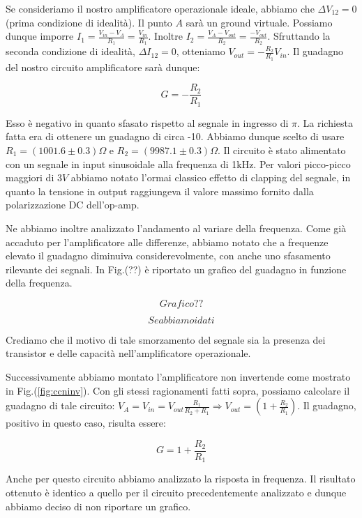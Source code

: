 Se consideriamo il nostro amplificatore operazionale ideale, abbiamo che $\Delta V_{12}=0$ (prima condizione di idealità).
Il punto $A$ sarà un ground virtuale.
Possiamo dunque imporre $I_1=\frac{V_{in}-V_A}{R_1}=\frac{V_{in}}{R_1}$.
Inoltre $I_2=\frac{V_A-V_{out}}{R_2}=\frac{-V_{out}}{R_2}$.
Sfruttando la seconda condizione di idealità, $\Delta I_{12}=0$, otteniamo $V_{out}=-\frac{R_2}{R_1} V_{in}$.
Il guadagno del nostro circuito amplificatore sarà dunque:

\begin{equation}
G=-\frac{R_2}{R_1}
\end{equation}

Esso è negativo in quanto sfasato rispetto al segnale in ingresso di $\pi$.
La richiesta fatta era di ottenere un guadagno di circa -10.
Abbiamo dunque scelto di usare $R_1=(1001.6\pm0.3)\Omega$ e $R_2=(9987.1\pm0.3)\Omega$.
Il circuito è stato alimentato con un segnale in input sinusoidale alla frequenza di 1kHz.
Per valori picco-picco maggiori di $3V$ abbiamo notato l'ormai classico effetto di clapping del segnale, in quanto la tensione in output raggiungeva il valore massimo fornito dalla polarizzazione DC dell'op-amp. 

Ne abbiamo inoltre analizzato l'andamento al variare della frequenza.
Come già accaduto per l'amplificatore alle differenze, abbiamo notato che a frequenze elevato il guadagno diminuiva considerevolmente, con anche uno sfasamento rilevante dei segnali.
In Fig.(??) è riportato un grafico del guadagno in funzione della frequenza. 

$$Grafico??$$

$$Se abbiamo i dati$$


Crediamo che il motivo di tale smorzamento del segnale sia la presenza dei transistor e delle capacità nell'amplificatore operazionale.


Successivamente abbiamo montato l'amplificatore non invertende come mostrato in Fig.(\ref{fig:ccninv}). Con gli stessi ragionamenti fatti sopra, possiamo calcolare il guadagno di tale circuito: $V_A=V_{in}=V_{out}\frac{R_1}{R_2+R_1} \Rightarrow V_{out}=(1+\frac{R_2}{R_1})$. Il guadagno, positivo in questo caso, risulta essere: 

\begin{equation}
G=1+\frac{R_2}{R_1}
\end{equation}

Anche per questo circuito abbiamo analizzato la risposta in frequenza.
Il risultato ottenuto è identico a quello per il circuito precedentemente analizzato e dunque abbiamo deciso di non riportare un grafico.